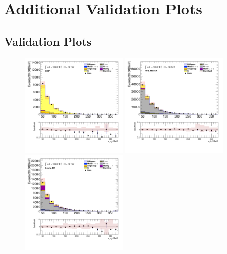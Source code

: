 \chapter{Additional Validation Plots}\label{app:valid-plots}

	\section{\taujets Validation Plots}\label{sec:taujet-valid-plots}

		\begin{figure}[!htp]
			\begin{center}    
			\includegraphics[width=0.45\textwidth]{chapters/chapter6_HPlus/images/taujets/tau_0_pt_TTBAR.png}
			\includegraphics[width=0.45\textwidth]{chapters/chapter6_HPlus/images/taujets/tau_0_pt_WJETS.png} \\
			\includegraphics[width=0.45\textwidth]{chapters/chapter6_HPlus/images/taujets/tau_0_pt_BVETO.png}

\end{center}
\end{figure}
